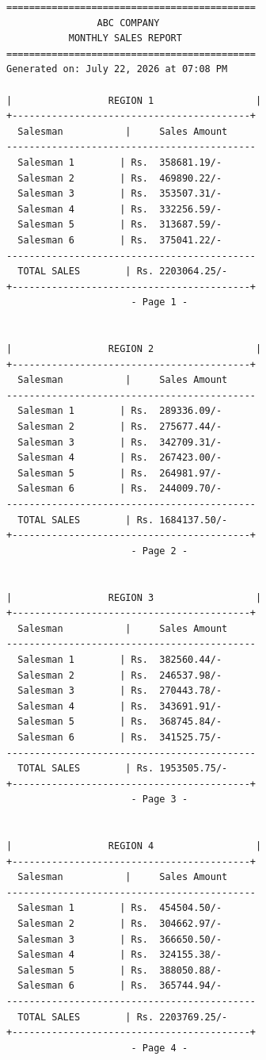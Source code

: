 \documentclass[12pt,a4paper]{article}
\begin{document}
\begin{lstlisting}[caption={report.txt - Program Output}]
============================================
                ABC COMPANY                 
           MONTHLY SALES REPORT             
============================================
Generated on: July 22, 2026 at 07:08 PM

|                 REGION 1                  |
+------------------------------------------+
  Salesman           |     Sales Amount  
--------------------------------------------
  Salesman 1        | Rs.  358681.19/-
  Salesman 2        | Rs.  469890.22/-
  Salesman 3        | Rs.  353507.31/-
  Salesman 4        | Rs.  332256.59/-
  Salesman 5        | Rs.  313687.59/-
  Salesman 6        | Rs.  375041.22/-
--------------------------------------------
  TOTAL SALES        | Rs. 2203064.25/-
+------------------------------------------+
                      - Page 1 -


|                 REGION 2                  |
+------------------------------------------+
  Salesman           |     Sales Amount  
--------------------------------------------
  Salesman 1        | Rs.  289336.09/-
  Salesman 2        | Rs.  275677.44/-
  Salesman 3        | Rs.  342709.31/-
  Salesman 4        | Rs.  267423.00/-
  Salesman 5        | Rs.  264981.97/-
  Salesman 6        | Rs.  244009.70/-
--------------------------------------------
  TOTAL SALES        | Rs. 1684137.50/-
+------------------------------------------+
                      - Page 2 -


|                 REGION 3                  |
+------------------------------------------+
  Salesman           |     Sales Amount  
--------------------------------------------
  Salesman 1        | Rs.  382560.44/-
  Salesman 2        | Rs.  246537.98/-
  Salesman 3        | Rs.  270443.78/-
  Salesman 4        | Rs.  343691.91/-
  Salesman 5        | Rs.  368745.84/-
  Salesman 6        | Rs.  341525.75/-
--------------------------------------------
  TOTAL SALES        | Rs. 1953505.75/-
+------------------------------------------+
                      - Page 3 -


|                 REGION 4                  |
+------------------------------------------+
  Salesman           |     Sales Amount  
--------------------------------------------
  Salesman 1        | Rs.  454504.50/-
  Salesman 2        | Rs.  304662.97/-
  Salesman 3        | Rs.  366650.50/-
  Salesman 4        | Rs.  324155.38/-
  Salesman 5        | Rs.  388050.88/-
  Salesman 6        | Rs.  365744.94/-
--------------------------------------------
  TOTAL SALES        | Rs. 2203769.25/-
+------------------------------------------+
                      - Page 4 -
\end{lstlisting}
\end{document}
